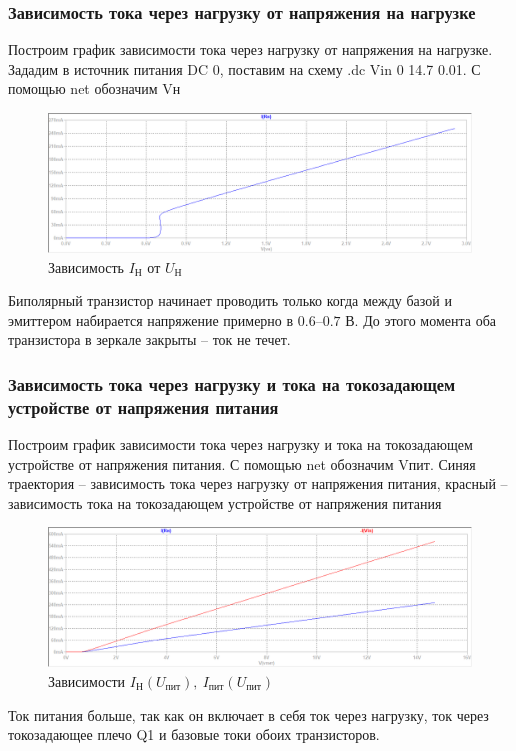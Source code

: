 \documentclass[a4paper, 12pt]{article}
\begin{document}
    \subsubsection{Зависимость тока через нагрузку от напряжения на нагрузке}
    Построим график зависимости тока через нагрузку от напряжения на нагрузке.
    Зададим в источник питания DC 0, поставим на схему .dc Vin 0 14.7 0.01.
    С помощью net обозначим Vн
    \begin{figure}[H]
        \centering
        \includegraphics[scale=0.46]{1task_Iн(Vн).png}
        \captionsetup{skip=0pt}
        \caption{Зависимость $I_\text{Н}$ от $U_\text{Н}$}
        \label{fig:1task_InVn}
    \end{figure}
    \noindent Биполярный транзистор начинает проводить только когда между базой
    и эмиттером набирается напряжение примерно в $0.6$--$0.7$ В. До этого момента
    оба транзистора в зеркале закрыты -- ток не течет.


    \subsubsection{Зависимость тока через нагрузку и тока на токозадающем устройстве от напряжения питания}
    Построим график зависимости тока через нагрузку и тока на токозадающем устройстве от напряжения питания.
    С помощью net обозначим Vпит. Синяя траектория -- зависимость тока через нагрузку от напряжения питания,
    красный -- зависимость тока на токозадающем устройстве от напряжения питания
    \begin{figure}[H]
        \centering
        \includegraphics[scale=0.46]{1task_Iн(Vпит)_Iпит(Vпит).png}
        \captionsetup{skip=0pt}
        \caption{Зависимости $I_\text{Н}\left( U_\text{пит} \right),\ I_\text{пит}\left( U_\text{пит} \right)$}
        \label{fig:1task_InVl_IlVl}
    \end{figure}
    \noindent Ток питания больше, так как он включает в себя ток через нагрузку, ток через токозадающее плечо Q1 и базовые токи обоих транзисторов.
\end{document}
